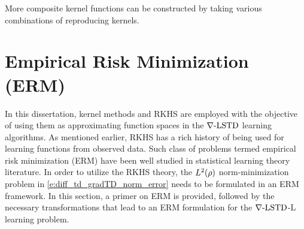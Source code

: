 More composite kernel functions can be constructed by taking various combinations of reproducing kernels. 
\section{Empirical Risk Minimization (ERM)}
\label{s:erm}
In this dissertation, kernel methods and RKHS are employed with the objective of using them as approximating function spaces in the $\nabla\text{-LSTD}$ learning algorithms. As mentioned earlier, RKHS has a rich history of being used for learning functions from observed data. Such class of problems termed empirical risk minimization (ERM) have been well studied in statistical learning theory literature. In order to utilize the RKHS theory, the $L^2(\rho)$ norm-minimization problem in \eqref{e:diff_td_gradTD_norm_error} needs to be formulated in an ERM framework. In this section, a primer on ERM is provided, followed by the necessary transformations that lead to an ERM formulation for the $\nabla\text{-LSTD}$-L learning problem.  

